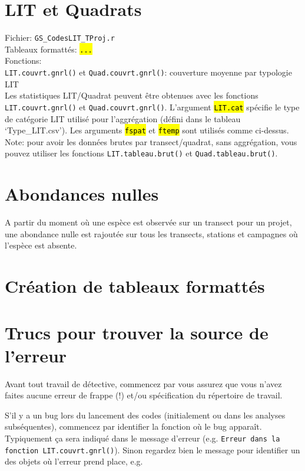 \documentclass{article}
\begin{document}
\section{LIT et Quadrats}
Fichier: \texttt{GS\_CodesLIT\_TProj.r}\\
Tableaux formattés: \hl{\texttt{...}}\\
Fonctions:\\
\texttt{LIT.couvrt.gnrl()} et \texttt{Quad.couvrt.gnrl()}: couverture
moyenne par typologie LIT\\

Les statistiques LIT/Quadrat peuvent être obtenues avec les fonctions
\texttt{LIT.couvrt.gnrl()} et \texttt{Quad.couvrt.gnrl()}. L'argument
\hl{\texttt{LIT.cat}} spécifie
le type de catégorie LIT utilisé pour l'aggrégation (défini dans le
tableau `Type\_LIT.csv'). Les arguments \hl{\texttt{fspat}} et
\hl{\texttt{ftemp}} sont utilisés comme ci-dessus. Note: pour avoir les
données brutes par transect/quadrat, sans aggrégation, vous pouvez
utiliser les fonctions \texttt{LIT.tableau.brut()} et
\texttt{Quad.tableau.brut()}.

\section{Abondances nulles}
A partir du moment où une espèce est observée sur un transect pour un
projet, une abondance nulle est rajoutée sur tous les transects,
stations et campagnes où l'espèce est absente. 


\section{Création de tableaux formattés}


\section{Trucs pour trouver la source de l'erreur}

Avant tout travail de détective, commencez par vous assurez que vous
n'avez faites aucune erreur de frappe (!) et/ou spécification du
répertoire de travail.

S'il y a un bug lors du lancement des codes (initialement ou dans les
analyses subséquentes), commencez par identifier la fonction où le bug
apparaît. Typiquement ça sera indiqué dans le message d'erreur
(e.g. \texttt{Erreur dans la fonction LIT.couvrt.gnrl()}). Sinon
regardez bien le message pour identifier un des objets où l'erreur
prend place, e.g. \\
\end{document}
